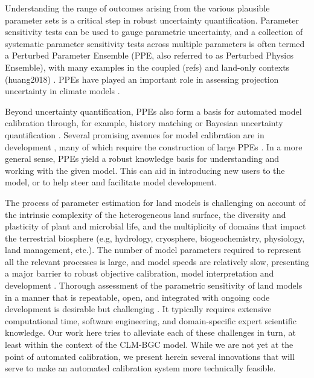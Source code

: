 \documentclass[draft]{agujournal2019}
\begin{document}
Understanding the range of outcomes arising from the various plausible parameter sets is a critical step in robust uncertainty quantification. 
Parameter sensitivity tests can be used to gauge parametric uncertainty, and
a collection of systematic parameter sensitivity tests across multiple parameters is often termed a Perturbed Parameter Ensemble (PPE, also referred to as Perturbed Physics Ensemble), with many examples in the coupled (refs) and land-only contexts (huang2018) \cite{dagon2020}. 
PPEs have played an important role in assessing projection uncertainty in climate models \cite{murphy2004,sanderson2008,booth2012,hawkins2019,yamazaki2021,peatier2022,tett2022}.

Beyond uncertainty quantification, PPEs also form a basis for automated model calibration through, for example, history matching \cite{williamson2013,williamson2017,hourdin2020,couvreux2021} or Bayesian uncertainty quantification \cite{cleary2021}.
Several promising avenues for model calibration are in development \cite{pinnington2020,cleary2021,alonso-gonzalez2022}, many of which require the construction of large PPEs \cite{qian2018}.
In a more general sense, PPEs yield a robust knowledge basis for understanding and working with the given model. 
This can aid in introducing new users to the model, or to help steer and facilitate model development.

The process of parameter estimation for land models is challenging on account of the intrinsic complexity of the heterogeneous land surface, the diversity and plasticity of plant and microbial life, and the multiplicity of domains that impact the terrestrial biosphere (e.g, hydrology, cryosphere, biogeochemistry, physiology, land management, etc.). The number of model parameters required to represent all the relevant processes is large, and model speeds are relatively slow, presenting a major barrier to robust objective calibration, model interpretation and development \cite{fisher2020,dagon2020}.
Thorough assessment of the parametric sensitivity of land models in a manner that is repeatable, open, and integrated with ongoing code development is desirable but challenging \cite{hourdin2017,balaji2022}. It typically requires extensive computational time,  software engineering, and domain-specific expert scientific knowledge.
Our work here tries to alleviate each of these challenges in turn, at least within the context of the CLM-BGC model.
While we are not yet at the point of automated calibration, we present herein several innovations that will serve to make an automated calibration system more technically feasible.
\end{document}
